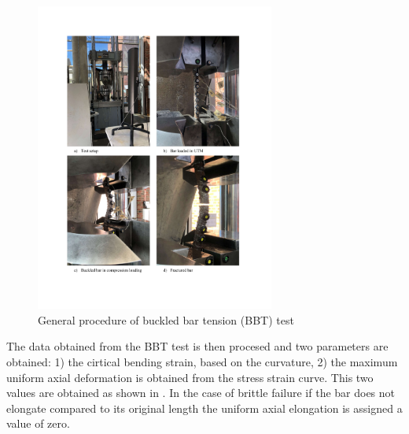 \begin{figure}[htbp]
	\centering
	\includegraphics[width=0.7\textwidth]{VAC Thesis 2.0/Chapter-4/figs/BBT Procedure.pdf}
	\caption{General procedure of buckled bar tension (BBT) test}
	\label{fig:BBT_Test_Summary}
\end{figure}

The data obtained from the BBT test is then procesed and two parameters are obtained: 1) the cirtical bending strain, based on the curvature, 2) the maximum uniform axial deformation is obtained from the stress strain curve. This two values are obtained as shown in . In the case of brittle failure if the bar does not elongate compared to its original length the uniform axial elongation is assigned a value of zero.

